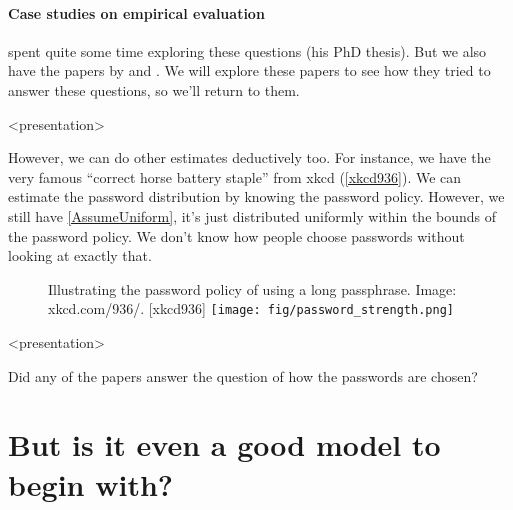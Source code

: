 \paragraph{Case studies on empirical evaluation}

\Textcite{GuessingHumanChosenSecrets2012} spent quite some time exploring these 
questions (his PhD thesis).
But we also have the papers by
\textcite{OfPasswordsAndPeople} and
\textcite{CanLongPasswordsBeSecureAndUsable}.
We will explore these papers to see how they tried to answer these questions, 
so we'll return to them.

\begin{frame}<presentation>
  \begin{example}
  \end{example}

  \begin{example}
  \end{example}
\end{frame}

However, we can do other estimates deductively too.
For instance, we have the very famous \enquote{correct horse battery staple} 
from xkcd (\cref{xkcd936}).
We can estimate the password distribution by knowing the password policy.
However, we still have \cref{AssumeUniform}, it's just distributed uniformly 
within the bounds of the password policy.
We don't know how people choose passwords without looking at exactly that.

\begin{frame}
  \begin{figure}[h]
    \begin{sidecaption}[xkcd 936]{%
      Illustrating the password policy of using a long passphrase.
      Image: xkcd.com/936/.
    }[xkcd936]
      \texttt{[image: fig/password\_strength.png]}
    \end{sidecaption}
  \end{figure}
\end{frame}

\begin{frame}<presentation>
  \begin{exercise}
    Did any of the papers answer the question of how the passwords are chosen?
  \end{exercise}
\end{frame}

\section[Is it a good model?]{But is it even a good model to begin with?}


